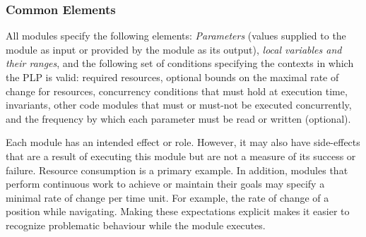 \documentclass[letterpaper]{article}
\newcommand\commentout[1]{}
\begin{document}
\commentout{
The formal definition of PLPs rests on the specification of properties of states of the world.
These are defined by specifying properties of various state variables.
%
In addition, each module may need access to certain resources. These resources could be energy or memory, some actuator, or some region of space. These must be specified, much like state variables, and coherent and consistent use of these names is required. In fact, resources can be viewed as a special class of state variables, whose state indicates the status of the resource (e.g., available, $> 100$ gallons, etc.).
However, because they carry special significance to programmers and operators, we distinguish them from other variables.

}

\subsubsection{Common Elements}
All modules specify the following elements:
 {\em Parameters} (values supplied to the module as input or provided by the module as its output),
{\em local variables and their ranges}, and the following set of conditions specifying the contexts in which the PLP is valid:
required resources, optional bounds on the maximal rate of change for resources, concurrency conditions that must hold
at execution time, invariants, other code modules that must or must-not be executed concurrently,
and the frequency by which each parameter must be read or written (optional).

Each module has an intended effect or role. However, it may also have side-effects that are a result of executing this module but are not a measure of its success or failure.  Resource consumption is a primary example.  In addition,
modules that perform continuous work to achieve or maintain their goals may specify a minimal rate of change per time unit.
For example, the rate of change of a position while navigating.
Making these expectations explicit makes it easier to recognize problematic behaviour while the module executes.
\end{document}

